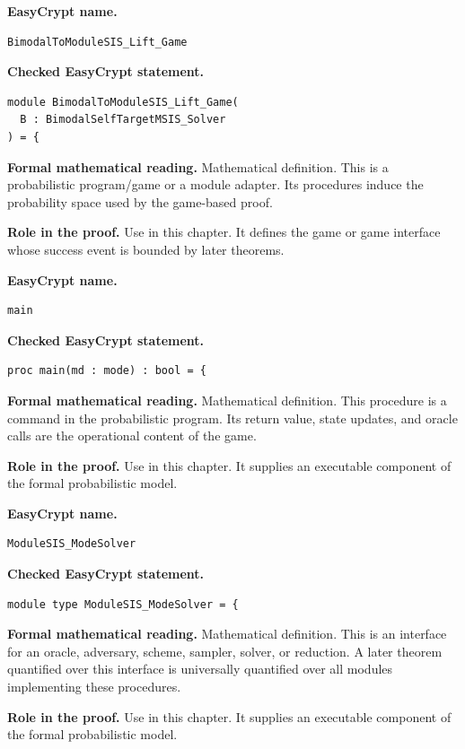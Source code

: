 \begin{formaldefinition}
\noindent\textbf{EasyCrypt name.}
\begin{lstlisting}[language=EasyCrypt,basicstyle=\ttfamily\scriptsize]
BimodalToModuleSIS_Lift_Game
\end{lstlisting}
\noindent\textbf{Checked EasyCrypt statement.}
\begin{lstlisting}[language=EasyCrypt,basicstyle=\ttfamily\scriptsize]
module BimodalToModuleSIS_Lift_Game(
  B : BimodalSelfTargetMSIS_Solver
) = {
\end{lstlisting}
\noindent\textbf{Formal mathematical reading.}
Mathematical definition. This is a probabilistic program/game or a module adapter.  Its procedures induce the probability space used by the game-based proof.

\noindent\textbf{Role in the proof.}
Use in this chapter. It defines the game or game interface whose success event is bounded by later theorems.

\end{formaldefinition}

\begin{formaldefinition}
\noindent\textbf{EasyCrypt name.}
\begin{lstlisting}[language=EasyCrypt,basicstyle=\ttfamily\scriptsize]
main
\end{lstlisting}
\noindent\textbf{Checked EasyCrypt statement.}
\begin{lstlisting}[language=EasyCrypt,basicstyle=\ttfamily\scriptsize]
proc main(md : mode) : bool = {
\end{lstlisting}
\noindent\textbf{Formal mathematical reading.}
Mathematical definition. This procedure is a command in the probabilistic program.  Its return value, state updates, and oracle calls are the operational content of the game.

\noindent\textbf{Role in the proof.}
Use in this chapter. It supplies an executable component of the formal probabilistic model.

\end{formaldefinition}

\begin{formaldefinition}
\noindent\textbf{EasyCrypt name.}
\begin{lstlisting}[language=EasyCrypt,basicstyle=\ttfamily\scriptsize]
ModuleSIS_ModeSolver
\end{lstlisting}
\noindent\textbf{Checked EasyCrypt statement.}
\begin{lstlisting}[language=EasyCrypt,basicstyle=\ttfamily\scriptsize]
module type ModuleSIS_ModeSolver = {
\end{lstlisting}
\noindent\textbf{Formal mathematical reading.}
Mathematical definition. This is an interface for an oracle, adversary, scheme, sampler, solver, or reduction.  A later theorem quantified over this interface is universally quantified over all modules implementing these procedures.

\noindent\textbf{Role in the proof.}
Use in this chapter. It supplies an executable component of the formal probabilistic model.

\end{formaldefinition}

